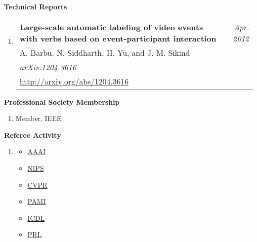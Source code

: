 \documentclass[10pt]{article}
\makeatletter
\newenvironment{publication}[5]
{ \item
  \begin{tabular*}{6.5in}{p{5.3in}@{\extracolsep{\fill}}r}
    \textbf{#1} & \textit{#2}\\ #3 &\\ \textit{#4}\\ #5
  \end{tabular*}
} {}
\newenvironment{region}[2]{%
  \vspace*{0.5ex}
  {\large \textbf{#1}}
  \begin{enumerate}[\color{RoyalBlue}#2]}
  {\end{enumerate}}
\makeatother
\begin{document}
\begin{region} {Technical Reports}{{T}1}
  \begin{publication} {Large-scale automatic labeling of video events with verbs based on event-participant interaction}
    {Apr. 2012}
    {A. Barbu, N. Siddharth, H. Yu, and J. M. Sikind}
    {arXiv:1204.3616}
    {\url{http://arxiv.org/abs/1204.3616}}
  \end{publication}
\end{region}


\begin{region} {Professional Society Membership}{}
  \item Member, IEEE
\end{region}

\begin{region} {Referee Activity}{}
  \item
    \begin{multicols}{8}
      \begin{itemize}
      \item \href{http://www.aaai.org/home.html}{AAAI}
      \item \href{http://nips.cc/}{NIPS}
      \item \href{http://www.pamitc.org/cvpr14/}{CVPR}
      \item \href{http://www.computer.org/portal/web/tpami}{PAMI}
      \item \href{http://www.icdl-epirob.org/}{ICDL}
      \item \href{http://www.journals.elsevier.com/pattern-recognition-letters/}{PRL}
      \end{itemize}
    \end{multicols}
\end{region}

\end{document}
